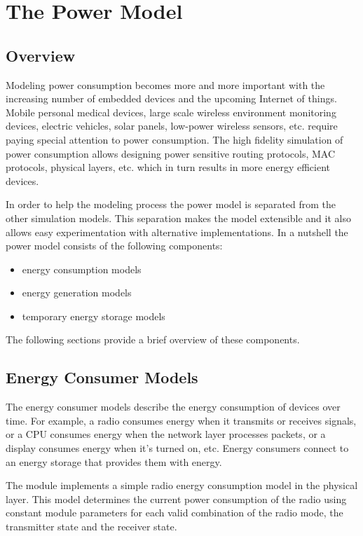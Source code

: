 \chapter{The Power Model}
\label{cha:power}

\section{Overview}

Modeling power consumption becomes more and more important with the increasing
number of embedded devices and the upcoming Internet of things. Mobile personal
medical devices, large scale wireless environment monitoring devices, electric
vehicles, solar panels, low-power wireless sensors, etc. require paying special
attention to power consumption. The high fidelity simulation of power consumption
allows designing power sensitive routing protocols, MAC protocols, physical
layers, etc. which in turn results in more energy efficient devices.

In order to help the modeling process the power model is separated from the other
simulation models. This separation makes the model extensible and it also allows
easy experimentation with alternative implementations. In a nutshell the power
model consists of the following components:

\begin{itemize}
  \item energy consumption models
  \item energy generation models
  \item temporary energy storage models
\end{itemize}

The following sections provide a brief overview of these components. 

\section{Energy Consumer Models}

The energy consumer models describe the energy consumption of devices over time.
For example, a radio consumes energy when it transmits or receives signals, or a
CPU consumes energy when the network layer processes packets, or a display
consumes energy when it's turned on, etc. Energy consumers connect to an energy
storage that provides them with energy.

The  module implements a simple radio energy
consumption model in the physical layer. This model determines the current power
consumption of the radio using constant module parameters for each valid
combination of the radio mode, the transmitter state and the receiver state.

